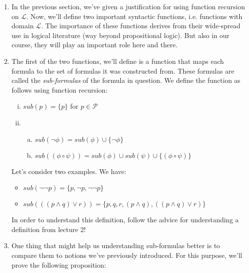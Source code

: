 	\begin{enumerate}[\thesection.1]

		\item In the previous section, we've given a justification for using function recursion on $\mathcal{L}$. Now, we'll define two important syntactic functions, i.e. functions with domain $\mathcal{L}$. The importance of these functions derives from their wide-spread use in logical literature (way beyond propositional logic). But also in our course, they will play an important role here and there.
		
		\item The first of the two functions, we'll define is a function that maps each formula to the set of formulas it was constructed from. These formulas are called the \emph{sub-formulas} of the formula in question. We define the function as follows using function recursion:
		\begin{enumerate}[(i)]
		
			\item $sub(p)=\{p\}$ for $p\in\mathcal{P}$
			
			\item \begin{enumerate}[(a)]
			
				\item $sub(\neg\phi)= sub(\phi)\cup\{\neg \phi\}$
				
				\item $sub((\phi\circ\psi))= sub(\phi)\cup sub(\psi)\cup\{(\phi\circ\psi)\}$
			
			\end{enumerate}
				\end{enumerate}
 Let's consider two examples. We have:
		
		\begin{itemize}
		
			\item $sub(\neg \neg p)=\{p,\neg p, \neg\neg p\}$
			
			\item $sub(((p\land q)\lor r))=\{p,q,r,(p\land q), ((p\land q)\lor r)\}$
		
		\end{itemize}
In order to understand this definition, follow the advice for understanding a definition from lecture 2!

	\item One thing that might help us understanding sub-formulas better is to compare them to notions we've previously introduced. For this purpose, we'll prove the following proposition:
	

\end{enumerate}
